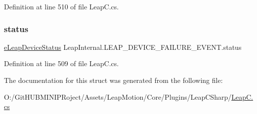 Definition at line 510 of file Leap\+C.\+cs.

\mbox{\label{struct_leap_internal_1_1_l_e_a_p___d_e_v_i_c_e___f_a_i_l_u_r_e___e_v_e_n_t_a9c36f440dcd127726dc77ce90f04ace8}} 
\subsubsection{\texorpdfstring{status}{status}}
{\footnotesize\ttfamily \mbox{\hyperlink{namespace_leap_internal_a16b28ea79f39b6205c514b3e9b075bed}{e\+Leap\+Device\+Status}} Leap\+Internal.\+L\+E\+A\+P\+\_\+\+D\+E\+V\+I\+C\+E\+\_\+\+F\+A\+I\+L\+U\+R\+E\+\_\+\+E\+V\+E\+N\+T.\+status}



Definition at line 509 of file Leap\+C.\+cs.



The documentation for this struct was generated from the following file\+:\begin{DoxyCompactItemize}
\item 
O\+:/\+Git\+H\+U\+B\+M\+I\+N\+I\+P\+Roject/\+Assets/\+Leap\+Motion/\+Core/\+Plugins/\+Leap\+C\+Sharp/\mbox{\hyperlink{_leap_c_8cs}{Leap\+C.\+cs}}\end{DoxyCompactItemize}
